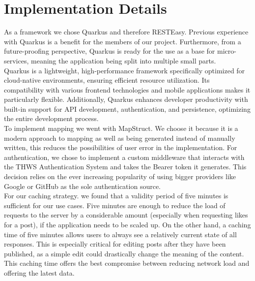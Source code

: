 \documentclass[a4paper, 11pt]{article}
\begin{document}
    \section{Implementation Details}\label{sec:implementation-details}
    As a framework we chose Quarkus and therefore RESTEasy. Previous experience with Quarkus is a benefit for the members of our project. Furthermore, from a future-proofing perspective, Quarkus is ready for the use as a base for micro-services, meaning the application being split into multiple small parts.\\
    Quarkus is a lightweight, high-performance framework specifically optimized for cloud-native environments, ensuring efficient resource utilization. Its compatibility with various frontend technologies and mobile applications makes it particularly flexible. Additionally, Quarkus enhances developer productivity with built-in support for API development, authentication, and persistence, optimizing the entire development process.\\
    To implement mapping we went with MapStruct. We choose it because it is a modern approach to mapping as well as being generated instead of manually written, this reduces the possibilities of user error in the implementation.
    For authentication, we chose to implement a custom middleware that interacts with the THWS Authentication System and takes the Bearer token it generates. This decision relies on the ever increasing popularity of using bigger providers like Google or GitHub as the sole authentication source.\\
    For our caching strategy. we found that a validity period of five minutes is sufficient for our use cases. Five minutes are enough to reduce the load of requests to the server by a considerable amount (especially when requesting likes for a post), if the application needs to be scaled up. On the other hand, a caching time of five minutes allows users to always see a relatively current state of all responses. This is especially critical for editing posts after they have been published, as a simple edit could drastically change the meaning of the content. This caching time offers the best compromise between reducing network load and offering the latest data.

\end{document}
